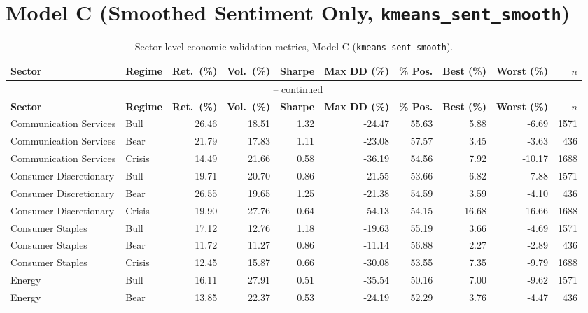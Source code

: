 \section{Model C (Smoothed Sentiment Only, \texttt{kmeans\_sent\_smooth})}
\label{annex:tables-modelC}

\begin{landscape}
\begin{longtable}{llrrrrrrrr}
\caption{Sector-level economic validation metrics, Model C (\texttt{kmeans\_sent\_smooth}).}
\label{tab:annexB-modelC}\\
\toprule
\textbf{Sector} & \textbf{Regime} & \textbf{Ret.\ (\%)} & \textbf{Vol.\ (\%)} & \textbf{Sharpe} & \textbf{Max DD (\%)} & \textbf{\% Pos.} & \textbf{Best (\%)} & \textbf{Worst (\%)} & \textbf{$n$} \\
\midrule
\endfirsthead
\multicolumn{10}{c}{\tablename\ \thetable{} -- continued} \\
\toprule
\textbf{Sector} & \textbf{Regime} & \textbf{Ret.\ (\%)} & \textbf{Vol.\ (\%)} & \textbf{Sharpe} & \textbf{Max DD (\%)} & \textbf{\% Pos.} & \textbf{Best (\%)} & \textbf{Worst (\%)} & \textbf{$n$} \\
\midrule
\endhead
\bottomrule
\endfoot
\bottomrule
\endlastfoot
Communication Services & Bull & 26.46 & 18.51 & 1.32 & -24.47 & 55.63 & 5.88 & -6.69 & 1571 \\
Communication Services & Bear & 21.79 & 17.83 & 1.11 & -23.08 & 57.57 & 3.45 & -3.63 & 436 \\
Communication Services & Crisis & 14.49 & 21.66 & 0.58 & -36.19 & 54.56 & 7.92 & -10.17 & 1688 \\
Consumer Discretionary & Bull & 19.71 & 20.70 & 0.86 & -21.55 & 53.66 & 6.82 & -7.88 & 1571 \\
Consumer Discretionary & Bear & 26.55 & 19.65 & 1.25 & -21.38 & 54.59 & 3.59 & -4.10 & 436 \\
Consumer Discretionary & Crisis & 19.90 & 27.76 & 0.64 & -54.13 & 54.15 & 16.68 & -16.66 & 1688 \\
Consumer Staples & Bull & 17.12 & 12.76 & 1.18 & -19.63 & 55.19 & 3.66 & -4.69 & 1571 \\
Consumer Staples & Bear & 11.72 & 11.27 & 0.86 & -11.14 & 56.88 & 2.27 & -2.89 & 436 \\
Consumer Staples & Crisis & 12.45 & 15.87 & 0.66 & -30.08 & 53.55 & 7.35 & -9.79 & 1688 \\
Energy & Bull & 16.11 & 27.91 & 0.51 & -35.54 & 50.16 & 7.00 & -9.62 & 1571 \\
Energy & Bear & 13.85 & 22.37 & 0.53 & -24.19 & 52.29 & 3.76 & -4.47 & 436 \\

\end{longtable}
\end{landscape}
